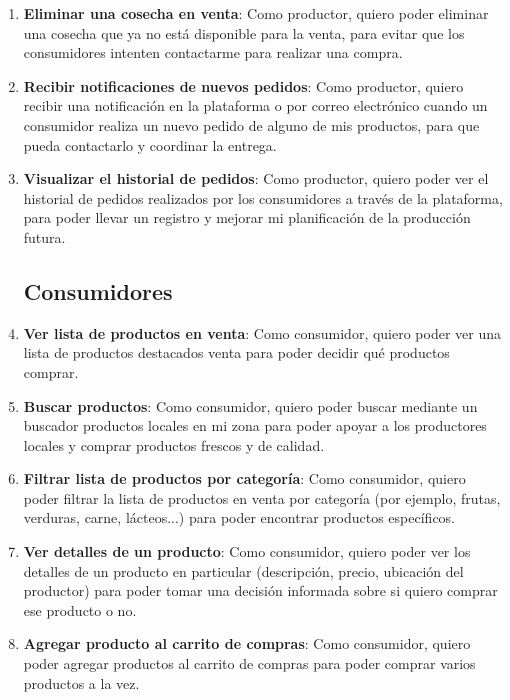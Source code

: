 \begin{enumerate}[HU-1:]
\item \textbf{Eliminar una cosecha en venta}: Como productor, quiero poder eliminar una cosecha que ya no está disponible para la venta, para evitar que los consumidores intenten contactarme para realizar una compra.

\item \textbf{Recibir notificaciones de nuevos pedidos}: Como productor, quiero recibir una notificación en la plataforma o por correo electrónico cuando un consumidor realiza un nuevo pedido de alguno de mis productos, para que pueda contactarlo y coordinar la entrega.

\item \textbf{Visualizar el historial de pedidos}: Como productor, quiero poder ver el historial de pedidos realizados por los consumidores a través de la plataforma, para poder llevar un registro y mejorar mi planificación de la producción futura.

\subsection{Consumidores}

\item \textbf{Ver lista de productos en venta}: Como consumidor, quiero poder ver una lista de productos destacados venta para poder decidir qué productos comprar.

\item \textbf{Buscar productos}: Como consumidor, quiero poder buscar mediante un buscador productos locales en mi zona para poder apoyar a los productores locales y comprar productos frescos y de calidad.

\item \textbf{Filtrar lista de productos por categoría}: Como consumidor, quiero poder filtrar la lista de productos en venta por categoría (por ejemplo, frutas, verduras, carne, lácteos...) para poder encontrar productos específicos.

\item \textbf{Ver detalles de un producto}: Como consumidor, quiero poder ver los detalles de un producto en particular (descripción, precio, ubicación del productor) para poder tomar una decisión informada sobre si quiero comprar ese producto o no.

\item \textbf{Agregar producto al carrito de compras}: Como consumidor, quiero poder agregar productos al carrito de compras para poder comprar varios productos a la vez.


\end{enumerate}
